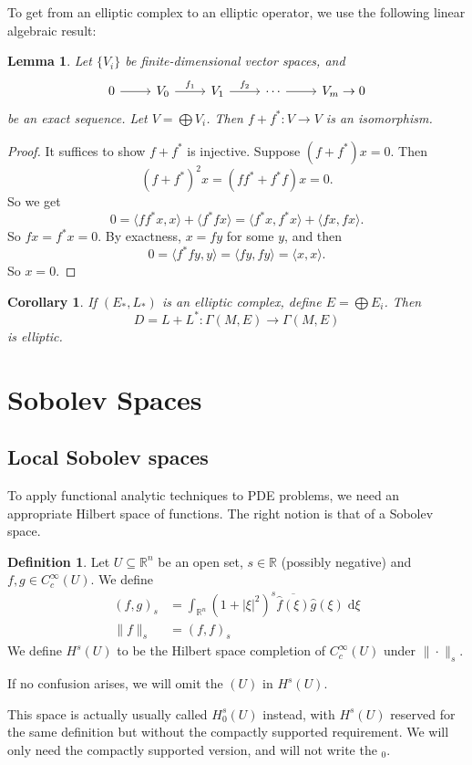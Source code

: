 \documentclass{shortart}
\newtheorem*{lemma}{Lemma}
\newtheorem*{cor}{Corollary}
\theoremstyle{definition}
\newtheorem*{defi}{Definition}
\newcommand\bra\langle
\newcommand\ket\rangle
\newcommand\R{\mathbb{R}}
\renewcommand\d{\mathrm{d}}
\begin{document}
To get from an elliptic complex to an elliptic operator, we use the following linear algebraic result:
\begin{lemma}
  Let $\{V_i\}$ be finite-dimensional vector spaces, and 
  \[
    \begin{tikzcd}
      0 \ar[r] & V_0 \ar[r, "f_1"] & V_1 \ar[r, "f_2"] & \cdots \ar[r] & V_m \to 0
    \end{tikzcd}
  \]
  be an exact sequence. Let $V = \bigoplus V_i$. Then $f + f^*: V \to V$ is an isomorphism.
\end{lemma}

\begin{proof}
  It suffices to show $f + f^*$ is injective. Suppose $(f + f^*)x = 0$. Then
  \[
    (f + f^*)^2 x = (ff^* + f^* f)x = 0.
  \]
  So we get
  \[
    0 = \bra ff^*x, x\ket + \bra f^*fx\ket = \bra f^* x, f^* x\ket + \bra fx, fx\ket.
  \]
  So $fx = f^*x = 0$. By exactness, $x = fy$ for some $y$, and then
  \[
    0 = \bra f^* fy, y\ket = \bra fy, fy\ket = \bra x, x \ket.
  \]
  So $x = 0$.
\end{proof}

\begin{cor}
  If $(E_*, L_*)$ is an elliptic complex, define $E = \bigoplus E_i$. Then
  \[
    D = L + L^*: \Gamma(M, E) \to \Gamma(M, E)
  \]
  is elliptic.\fakeqed
\end{cor}

\section{Sobolev Spaces}
\subsection{Local Sobolev spaces}
To apply functional analytic techniques to PDE problems, we need an appropriate Hilbert space of functions. The right notion is that of a Sobolev space.
\begin{defi}
  Let $U \subseteq \R^n$ be an open set, $s \in \R$ (possibly negative) and $f, g \in C_c^\infty(U)$. We define
  \begin{align*}
    (f, g)_s &= \int_{\R^n} (1 + |\xi|^2)^s \overline{\hat{f}(\xi)}\hat{g}(\xi) \;\d \xi\\
    \|f\|_s &= (f, f)_s
  \end{align*}
  We define $H^s(U)$ to be the Hilbert space completion of $C_c^\infty(U)$ under $\|\cdot\|_s$.

  If no confusion arises, we will omit the $(U)$ in $H^s(U)$.
\end{defi}
This space is actually usually called $H_0^s(U)$ instead, with $H^s(U)$ reserved for the same definition but without the compactly supported requirement. We will only need the compactly supported version, and will not write the $_0$.
\end{document}

